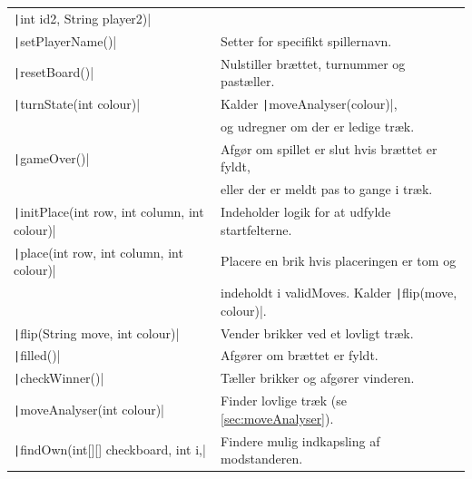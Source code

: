 \begin{table}[H]
\begin{tabular}{ll}
        \quad \texttt|int id2, String player2)|             &                                                                       \\
        \texttt|setPlayerName()|                            & Setter for specifikt spillernavn.                                     \\
        \texttt|resetBoard()|                               & Nulstiller brættet, turnummer og pastæller.                           \\
        \texttt|turnState(int colour)|                      & Kalder \texttt|moveAnalyser(colour)|,                       \\
                                                                      & og udregner om der er ledige træk.                                    \\
        \texttt|gameOver()|                                 & Afgør om spillet er slut hvis brættet er fyldt,                       \\
                                                                      & eller der er meldt pas to gange i træk.                               \\
        \texttt|initPlace(int row, int column, int colour)| & Indeholder logik for at udfylde startfelterne.                        \\
        \texttt|place(int row, int column, int colour)|     & Placere en brik hvis placeringen er tom og                            \\
                                                                      & indeholdt i validMoves. Kalder \texttt|flip(move, colour)|. \\
        \texttt|flip(String move, int colour)|              & Vender brikker ved et lovligt træk.                                   \\
        \texttt|filled()|                                   & Afgører om brættet er fyldt.                                          \\
        \texttt|checkWinner()|                              & Tæller brikker og afgører vinderen.                                   \\
        \texttt|moveAnalyser(int colour)|                   & Finder lovlige træk (se \cref{sec:moveAnalyser}).                     \\
        \texttt|findOwn(int[][] checkboard, int i,|         & Findere mulig indkapsling af modstanderen.                            \\

\end{tabular}
\end{table}

